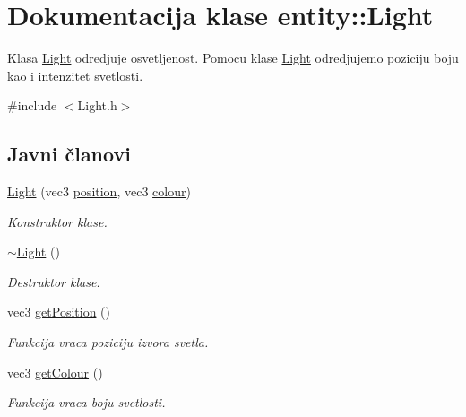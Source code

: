 \hypertarget{classentity_1_1Light}{}\section{Dokumentacija klase entity\+:\+:Light}
\label{classentity_1_1Light}


Klasa \hyperlink{classentity_1_1Light}{Light} odredjuje osvetljenost. Pomocu klase \hyperlink{classentity_1_1Light}{Light} odredjujemo poziciju boju kao i intenzitet svetlosti.  




{\ttfamily \#include $<$Light.\+h$>$}

\subsection*{Javni članovi}
\begin{DoxyCompactItemize}
\item 
\hyperlink{classentity_1_1Light_a803705cea46720608058911bb426fa57}{Light} (vec3 \hyperlink{classentity_1_1Light_a1c8e3d9bb8ba4f1c4e1c370cfa5ebe15}{position}, vec3 \hyperlink{classentity_1_1Light_a637c529cb886fb092ea0775b4821671d}{colour})
\begin{DoxyCompactList}\small\item\em Konstruktor klase. \end{DoxyCompactList}\item 
\hyperlink{classentity_1_1Light_a7d0af8d0bea98a97c4e61c23b562f6fa}{$\sim$\+Light} ()
\begin{DoxyCompactList}\small\item\em Destruktor klase. \end{DoxyCompactList}\item 
vec3 \hyperlink{classentity_1_1Light_aca0644bed009e20c672224ed0c92546e}{get\+Position} ()
\begin{DoxyCompactList}\small\item\em Funkcija vraca poziciju izvora svetla. \end{DoxyCompactList}\item 
vec3 \hyperlink{classentity_1_1Light_a84799bc558b5c06758cd5e343243df4b}{get\+Colour} ()
\begin{DoxyCompactList}\small\item\em Funkcija vraca boju svetlosti. \end{DoxyCompactList}\end{DoxyCompactItemize}

